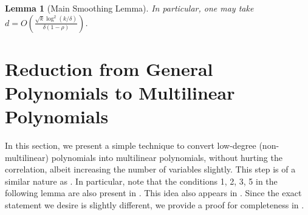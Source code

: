 \documentclass[11pt]{article}
\newcommand{\inparen}[1]{\left ( #1 \right )}
\newtheorem{lem}[theorem]{Lemma}
\begin{document}
\begin{lem}[Main Smoothing Lemma]
	\noindent In particular, one may take $d = O\inparen{\frac{\sqrt{k}\log^2 (k/\delta)}{\delta (1 - \rho)}}$. %
\end{lem}%

\section{Reduction from General Polynomials to Multilinear Polynomials} \label{sec:non-multilinear}

In this section, we present a simple technique to convert low-degree (non-multilinear) polynomials into multilinear polynomials, without hurting the correlation, albeit increasing the number of variables slightly. This step is of a similar nature as . In particular, note that the conditions 1, 2, 3, 5 in the following lemma are also present in . This idea also appears in \cite{DMN_NoiseStabilityComputable, DMN_NIS_decidable}. Since the exact statement we desire is slightly different, we provide a proof for completeness in .
\end{document}
